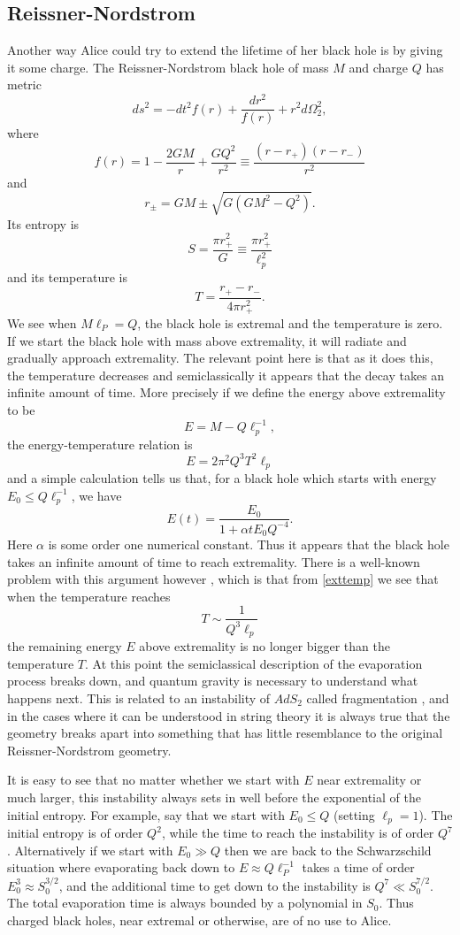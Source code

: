 \documentclass[12pt]{article}
\newcommand{\be}{\begin{equation}}
\newcommand{\ee}{\end{equation}}
\begin{document}
\subsection{Reissner-Nordstrom}
Another way Alice could try to extend the lifetime of her black hole is by giving it some charge.  The Reissner-Nordstrom black hole of mass $M$ and charge $Q$ has metric
\be
ds^2=-dt^2f(r)+\frac{dr^2}{f(r)}+r^2 d\Omega_2^2,
\ee
where
\be
f(r)=1-\frac{2GM}{r}+\frac{GQ^2}{r^2}\equiv \frac{(r-r_+)(r-r_-)}{r^2}
\ee
and
\be
r_\pm=GM\pm\sqrt{G(GM^2-Q^2)}.
\ee
Its entropy is 
\be
S=\frac{\pi r_+^2}{G}\equiv \frac{\pi r_+^2}{\ell_p^2}
\ee
and its temperature is
\be
T=\frac{r_+-r_-}{4\pi r_+^2}.
\ee
We see when $M\ell_P=Q$, the black hole is extremal and the temperature is zero.  If we start the black hole with mass above extremality, it will radiate and gradually approach extremality.  The relevant point here is that as it does this, the temperature decreases and semiclassically it appears that the decay takes an infinite amount of time.  More precisely if we define the energy above extremality to be
\be
E=M-Q\ell_p^{-1},
\ee
the energy-temperature relation is
\be\label{exttemp}
E=2\pi^2 Q^3 T^2 \ell_p
\ee
and a simple calculation tells us that, for a black hole which starts with energy $E_0\leq Q\ell_p^{-1}$, we have
\be
E(t)=\frac{E_0}{1+\alpha tE_0Q^{-4}}.
\ee
Here $\alpha$ is some order one numerical constant.  Thus it appears that the black hole takes an infinite amount of time to reach extremality.  There is a well-known problem with this argument however \cite{Preskill:1991tb,maldstrom}, which is that from \eqref{exttemp} we see that when the temperature reaches
\be
T\sim \frac{1}{Q^3 \ell_p}
\ee
the remaining energy $E$ above extremality is no longer bigger than the temperature $T$.  At this point the semiclassical description of the evaporation process breaks down, and quantum gravity is necessary to understand what happens next.  This is related to an instability of $AdS_2$ called fragmentation \cite{maldstrom}, and in the cases where it can be understood in string theory it is always true that the geometry breaks apart into something that has little resemblance to the original Reissner-Nordstrom geometry.

It is easy to see that no matter whether we start with $E$ near extremality or much larger, this instability always sets in well before the exponential of the initial entropy.  For example,  say that we start with $E_0\leq Q$ (setting $\ell_p=1$).  The initial entropy is of order $Q^2$, while the time to reach the instability is of order $Q^7$.  Alternatively if we start with $E_0\gg Q$ then we are back to the Schwarzschild situation where evaporating back down to $E\approx Q \ell_P^{-1}$ takes a time of order $E_0^3\approx S_0^{3/2}$, and the additional time to get down to the instability is $Q^7\ll S_0^{7/2}$.  The total evaporation time is always bounded by a polynomial in $S_0$.  Thus charged black holes, near extremal or otherwise, are of no use to Alice.
\end{document}
